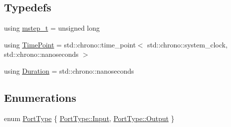 \subsection*{Typedefs}
\begin{DoxyCompactItemize}
\item 
using \hyperlink{namespacereactor_aaea1189d617982457b74127ba74a7340}{mstep\+\_\+t} = unsigned long
\item 
using \hyperlink{namespacereactor_ad950f8d1a46612500286a4af0f167080}{Time\+Point} = std\+::chrono\+::time\+\_\+point$<$ std\+::chrono\+::system\+\_\+clock, std\+::chrono\+::nanoseconds $>$
\item 
using \hyperlink{namespacereactor_aa8375b807a80703545664096c5b5b779}{Duration} = std\+::chrono\+::nanoseconds
\end{DoxyCompactItemize}
\subsection*{Enumerations}
\begin{DoxyCompactItemize}
\item 
enum \hyperlink{namespacereactor_a08c8e2d85e5bc706b1af8a87e40eec6d}{Port\+Type} \{ \hyperlink{namespacereactor_a08c8e2d85e5bc706b1af8a87e40eec6da324118a6721dd6b8a9b9f4e327df2bf5}{Port\+Type\+::\+Input}, 
\hyperlink{namespacereactor_a08c8e2d85e5bc706b1af8a87e40eec6da29c2c02a361c9d7028472e5d92cd4a54}{Port\+Type\+::\+Output}
 \}
\end{DoxyCompactItemize}
